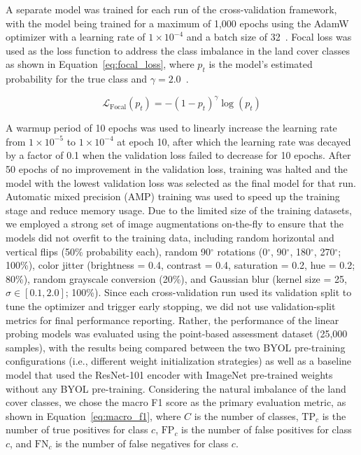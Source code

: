 

A separate model was trained for each run of the cross-validation framework, with the model being trained for a maximum of 1,000 epochs using the AdamW optimizer with a learning rate of \(1 \times 10^{-4}\) and a batch size of 32~\citep{loshchilovDecoupledWeightDecay2019}.
Focal loss was used as the loss function to address the class imbalance in the land cover classes as shown in Equation~\ref{eq:focal_loss}, where \(p_t\) is the model's estimated probability for the true class and \(\gamma=2.0\)~\citep{linFocalLossDense2017}.

\begin{equation}\label{eq:focal_loss}
    \mathcal{L}_\text{Focal}(p_t) = -(1 - p_t)^\gamma \log(p_t)
\end{equation}

A warmup period of 10 epochs was used to linearly increase the learning rate from \(1 \times 10^{-5}\) to \(1 \times 10^{-4}\) at epoch 10, after which the learning rate was decayed by a factor of 0.1 when the validation loss failed to decrease for 10 epochs.
After 50 epochs of no improvement in the validation loss, training was halted and the model with the lowest validation loss was selected as the final model for that run.
Automatic mixed precision (AMP) training was used to speed up the training stage and reduce memory usage.
Due to the limited size of the training datasets, we employed a strong set of image augmentations on-the-fly to ensure that the models did not overfit to the training data, including random horizontal and vertical flips (50\% probability each), random 90\(^\circ\) rotations (0\(^\circ\), 90\(^\circ\), 180\(^\circ\), 270\(^\circ\); 100\%), color jitter (brightness = 0.4, contrast = 0.4, saturation = 0.2, hue = 0.2; 80\%), random grayscale conversion (20\%), and Gaussian blur (kernel size = 25, \(\sigma \in [0.1, 2.0]\); 100\%).
Since each cross-validation run used its validation split to tune the optimizer and trigger early stopping, we did not use validation-split metrics for final performance reporting.
Rather, the performance of the linear probing models was evaluated using the point-based assessment dataset (25,000 samples), with the results being compared between the two BYOL pre-training configurations (i.e., different weight initialization strategies) as well as a baseline model that used the ResNet-101 encoder with ImageNet pre-trained weights without any BYOL pre-training.
Considering the natural imbalance of the land cover classes, we chose the macro F1 score as the primary evaluation metric, as shown in Equation~\ref{eq:macro_f1}, where \(C\) is the number of classes, \(\text{TP}_c\) is the number of true positives for class \(c\), \(\text{FP}_c\) is the number of false positives for class \(c\), and \(\text{FN}_c\) is the number of false negatives for class \(c\).

